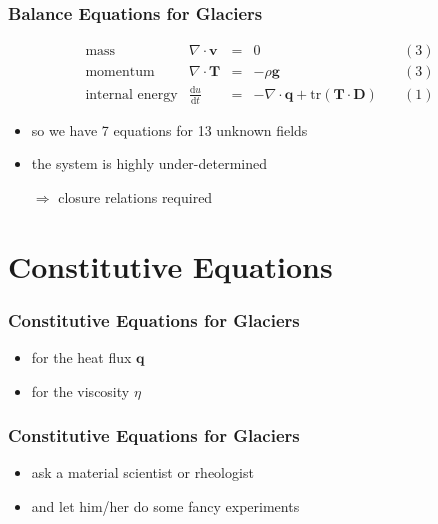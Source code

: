 \documentclass[hide notes,intlimits]{beamer}
\begin{document}
\begin{frame}
  \frametitle{Balance Equations for Glaciers}
  \large{
  \begin{equation*}
  \begin{array}{lcclc}
    \text{mass} &  \nabla \cdot \mathbf{v} & = & 0 \quad & (3)\\
    \text{momentum} & \nabla \cdot \mathbf{T} & = & - \rho \mathbf{g} \quad & (3)\\
    \text{internal energy} & \frac{\text{d} u}{\text{d} t} & = & - \nabla \cdot \mathbf{q} + \text{tr}\left(\mathbf{T}\cdot\mathbf{D}\right) \quad & (1)
  \end{array}
  \end{equation*}
  }
  \begin{itemize}
   \item so we have 7 equations for 13 unknown fields
   \item the system is highly under-determined
   \item[$\Rightarrow$] \alert{closure relations} required
 \end{itemize}
\end{frame}


\section{Constitutive Equations}

\begin{frame}
  \frametitle{Constitutive Equations for Glaciers}
  \begin{itemize}
    \item for the heat flux $\mathbf{q}$
    \item for the viscosity $\eta$
  \end{itemize}
\end{frame}


\begin{frame}
  \frametitle{Constitutive Equations for Glaciers}
  \begin{itemize}
    \item ask a material scientist or rheologist
    \item and let him/her do some fancy experiments
 \end{itemize}
\end{frame}
\end{document}
